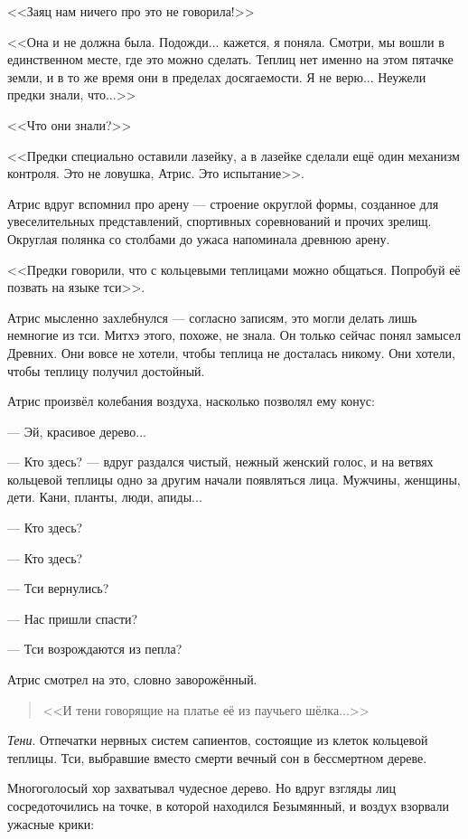 <<Заяц нам ничего про это не говорила!>>

<<Она и не должна была.
Подожди... кажется, я поняла.
Смотри, мы вошли в единственном месте, где это можно сделать.
Теплиц нет именно на этом пятачке земли, и в то же время они в пределах досягаемости.
Я не верю...
Неужели предки знали, что...>>

<<Что они знали?>>

<<Предки специально оставили лазейку, а в лазейке сделали ещё один механизм контроля.
Это не ловушка, Атрис.
Это испытание>>.

Атрис вдруг вспомнил про арену --- строение округлой формы, созданное для увеселительных представлений, спортивных соревнований и прочих зрелищ.
Округлая полянка со столбами до ужаса напоминала древнюю арену.

<<Предки говорили, что с кольцевыми теплицами можно общаться.
Попробуй её позвать на языке тси>>.

Атрис мысленно захлебнулся --- согласно записям, это могли делать лишь немногие из тси.
Митхэ этого, похоже, не знала.
Он только сейчас понял замысел Древних.
Они вовсе не хотели, чтобы теплица не досталась никому.
Они хотели, чтобы теплицу получил достойный.

Атрис произвёл колебания воздуха, насколько позволял ему конус:

--- Эй, красивое дерево...

--- Кто здесь? --- вдруг раздался чистый, нежный женский голос, и на ветвях кольцевой теплицы одно за другим начали появляться лица.
Мужчины, женщины, дети.
Кани, планты, люди, апиды...

--- Кто здесь?

--- Кто здесь?

--- Тси вернулись?

--- Нас пришли спасти?

--- Тси возрождаются из пепла?

Атрис смотрел на это, словно заворожённый.

\begin{verse}
<<И тени говорящие на платье её из паучьего шёлка...>>
\end{verse}

\emph{Тени}.
Отпечатки нервных систем сапиентов, состоящие из клеток кольцевой теплицы.
Тси, выбравшие вместо смерти вечный сон в бессмертном дереве.

Многоголосый хор захватывал чудесное дерево.
Но вдруг взгляды лиц сосредоточились на точке, в которой находился Безымянный, и воздух взорвали ужасные крики:

